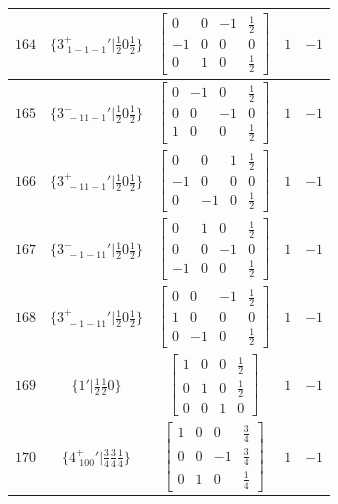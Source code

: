 \documentclass[fleqn,8pt]{jsarticle}
\begin{document}
\begin{longtable}{ccccc}
$ 164 $ & $ \{3^{+}_{\,\,1-1-1}{}'|\frac{1}{2} 0 \frac{1}{2}\} $ & $ \begin{bmatrix} 0 & 0 & -1 & \frac{1}{2} \\ -1 & 0 & 0 & 0 \\ 0 & 1 & 0 & \frac{1}{2} \end{bmatrix} $ & $ 1 $ & $ -1 $ \\ \hline
$ 165 $ & $ \{3^{-}_{\,\,-11-1}{}'|\frac{1}{2} 0 \frac{1}{2}\} $ & $ \begin{bmatrix} 0 & -1 & 0 & \frac{1}{2} \\ 0 & 0 & -1 & 0 \\ 1 & 0 & 0 & \frac{1}{2} \end{bmatrix} $ & $ 1 $ & $ -1 $ \\ \hline
$ 166 $ & $ \{3^{+}_{\,\,-11-1}{}'|\frac{1}{2} 0 \frac{1}{2}\} $ & $ \begin{bmatrix} 0 & 0 & 1 & \frac{1}{2} \\ -1 & 0 & 0 & 0 \\ 0 & -1 & 0 & \frac{1}{2} \end{bmatrix} $ & $ 1 $ & $ -1 $ \\ \hline
$ 167 $ & $ \{3^{-}_{\,\,-1-11}{}'|\frac{1}{2} 0 \frac{1}{2}\} $ & $ \begin{bmatrix} 0 & 1 & 0 & \frac{1}{2} \\ 0 & 0 & -1 & 0 \\ -1 & 0 & 0 & \frac{1}{2} \end{bmatrix} $ & $ 1 $ & $ -1 $ \\ \hline
$ 168 $ & $ \{3^{+}_{\,\,-1-11}{}'|\frac{1}{2} 0 \frac{1}{2}\} $ & $ \begin{bmatrix} 0 & 0 & -1 & \frac{1}{2} \\ 1 & 0 & 0 & 0 \\ 0 & -1 & 0 & \frac{1}{2} \end{bmatrix} $ & $ 1 $ & $ -1 $ \\ \hline
$ 169 $ & $ \{1{}'|\frac{1}{2} \frac{1}{2} 0\} $ & $ \begin{bmatrix} 1 & 0 & 0 & \frac{1}{2} \\ 0 & 1 & 0 & \frac{1}{2} \\ 0 & 0 & 1 & 0 \end{bmatrix} $ & $ 1 $ & $ -1 $ \\ \hline
$ 170 $ & $ \{4^{+}_{\,\,100}{}'|\frac{3}{4} \frac{3}{4} \frac{1}{4}\} $ & $ \begin{bmatrix} 1 & 0 & 0 & \frac{3}{4} \\ 0 & 0 & -1 & \frac{3}{4} \\ 0 & 1 & 0 & \frac{1}{4} \end{bmatrix} $ & $ 1 $ & $ -1 $ \\ \hline

\end{longtable}
\end{document}

